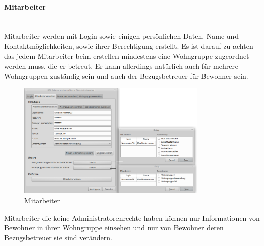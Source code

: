 \paragraph{Mitarbeiter}\mbox{}\\
Mitarbeiter werden mit Login sowie einigen persönlichen Daten, Name und Kontaktmöglichkeiten, sowie ihrer Berechtigung erstellt. Es ist darauf zu achten das jedem Mitarbeiter beim erstellen mindestens eine Wohngruppe zugeordnet werden muss, die er betreut. Er kann allerdings natürlich auch für mehrere Wohngruppen zuständig sein und auch der Bezugsbetreuer für Bewohner sein.
\begin{figure}[h]
	\begin{center}
		\includegraphics[keepaspectratio=true, width=0.8\textwidth]{pics/admin1.png}
		\caption{Mitarbeiter}
		\label{Admindialog Mitarbeiter}
	\end{center}
\end{figure}
\FloatBarrier
\noindent
Mitarbeiter die keine Administratorenrechte haben können nur Informationen von Bewohner in ihrer Wohngruppe einsehen und nur von Bewohner deren Bezugsbetreuer sie sind verändern.
\newpage
